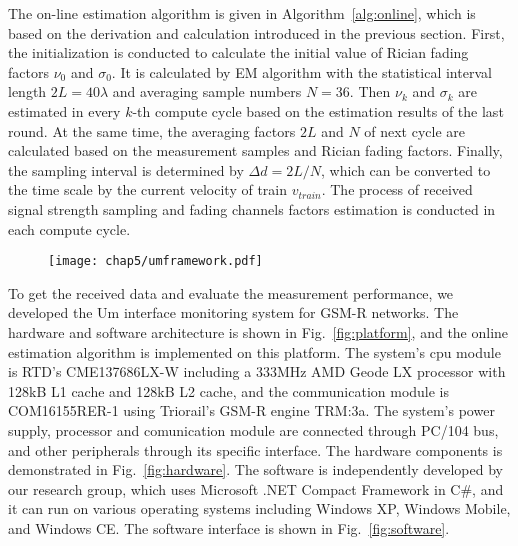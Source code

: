 The on-line estimation algorithm is given in Algorithm~\ref{alg:online}, which is based on the derivation and calculation introduced in the previous section. First, the initialization is conducted to calculate the initial value of Rician fading factors $\nu_0$ and $\sigma_0$. It is calculated by EM algorithm with the statistical interval length $2L=40\lambda$ and averaging sample numbers $N=36$. Then $\nu_k$ and $\sigma_k$ are estimated in every $k$-th compute cycle based on the estimation results of the last round. At the same time, the averaging factors $2L$ and $N$ of next cycle are calculated based on the measurement samples and Rician fading factors. Finally, the sampling interval is determined by $\Delta d=2L/N$, which can be converted to the time scale by the current velocity of train $v_{train}$. The process of received signal strength sampling and fading channels factors estimation is conducted in each compute cycle.

\begin{figure}[!htp]
\centering
    \texttt{[image: chap5/umframework.pdf]}
\end{figure}

To get the received data and evaluate the measurement performance, we developed the Um interface monitoring system for GSM-R networks. The hardware and software architecture is shown in Fig.~\ref{fig:platform}, and the online estimation algorithm is implemented on this platform. The system's cpu module is RTD's CME137686LX-W including a 333MHz AMD Geode LX processor with 128kB L1 cache and 128kB L2 cache, and the communication module is COM16155RER-1 using Triorail's GSM-R engine TRM:3a. The system's power supply, processor and comunication module are connected through PC/104 bus, and other peripherals through its specific interface. The hardware components is demonstrated in Fig.~\ref{fig:hardware}. The software is independently developed by our research group, which uses Microsoft .NET Compact Framework in C\#, and it can run on various operating systems including Windows XP, Windows Mobile, and Windows CE. The software interface is shown in Fig.~\ref{fig:software}.

\begin{figure}[!htp]
\centering
{}
    \hspace{1cm}
\end{figure}

